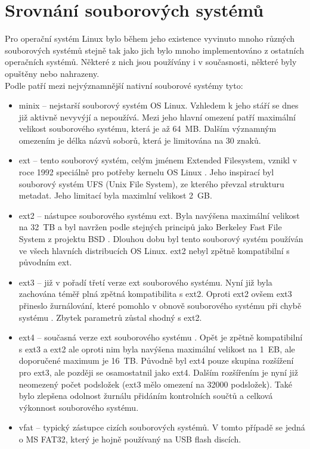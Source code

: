 \section{Srovnání souborových systémů}
Pro operační systém Linux bylo během jeho existence vyvinuto mnoho různých souborových systémů stejně tak jako jich bylo mnoho implementováno z ostatních operačních systémů. Některé z nich jsou používány i v současnosti, některé byly opuštěny nebo nahrazeny.\\
Podle \cite{tldp-filesystem} patří mezi nejvýznamnější nativní souborové systémy tyto:
\begin{itemize}
    \item minix -- nejstarší souborový systém OS Linux. Vzhledem k jeho stáří se dnes již aktivně nevyvýjí a nepoužívá. Mezi jeho hlavní omezení patří maximální velikost souborového systému, která je až 64~MB. Dalším významným omezením je délka názvů soborů, která je limitována na 30 znaků.
    \item ext -- tento souborový systém, celým jménem Extended Filesystem, vznikl v roce 1992 speciálně pro potřeby kernelu OS Linux \cite{linmag-ext}. Jeho inspirací byl souborový systém UFS (Unix File System), ze kterého převzal strukturu metadat. Jeho limitací byla maximlní velikost 2~GB.
    \item ext2 -- nástupce souborového systému ext. Byla navýšena maximální velikost na 32~TB a byl navržen podle stejných principů jako Berkeley Fast File System z projektu BSD \cite{nongnu-ext2}. Dlouhou dobu byl tento souborový systém používán ve všech hlavních distribucích OS Linux. ext2 nebyl zpětně kompatibilní s původním ext.
    \item ext3 -- již v pořadí třetí verze ext souborového systému. Nyní již byla zachována téměř plná zpětná kompatibilita s ext2. Oproti ext2 ovšem ext3 přineslo žurnálování, které pomohlo v obnově souborového systému při chybě systému \cite{paper-ext3}. Zbytek parametrů zůstal shodný s ext2.
    \item ext4 -- současná verze ext souborového systému \cite{paper-ext4}. Opět je zpětně kompatibilní s ext3 a ext2 ale oproti nim byla navýšena maximální velikost na 1~EB, ale doporučené maximum je 16~TB. Původně byl ext4 pouze skupina rozšížení pro ext3, ale později se osamostatnil jako ext4. Dalším rozšířením je nyní již neomezený počet podsložek (ext3 mělo omezení na 32000 podsložek). Také bylo zlepšena odolnost žurnálu přidáním kontrolních součtů a celková výkonnost souborového systému.
    \item vfat -- typický zástupce cizích souborových systémů. V tomto případě se jedná o MS FAT32, který je hojně používaný na USB flash discích.

\end{itemize}
